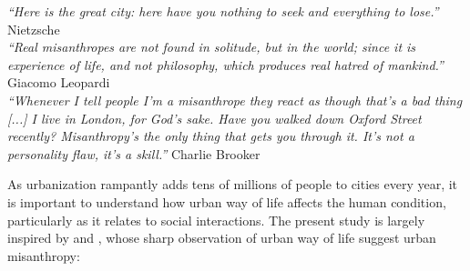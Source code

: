 \documentclass[11pt, letterpaper]{article}
\newcommand{\emd}[1]{\ExecuteMetaData[/tmp/tex]{#1}} %
\begin{document}

\begin{spacing}{1.4} %
\vspace{.25in}

{\small\it \noindent ``Here is the great city: here have you nothing to seek and
  everything to lose.''} Nietzsche\\

{\small\it \noindent ``Real misanthropes are not found in solitude, but in the world; since it is experience of life, and not philosophy, which produces real hatred of mankind.''} Giacomo Leopardi\\

{\small\it \noindent ``Whenever I tell people I'm a misanthrope they react as
  though that's a bad thing [...] I live in London, for God's sake. Have you
  walked down Oxford Street recently? Misanthropy's the only thing that gets you
  through it. It's not a personality flaw, it's a skill.''} Charlie Brooker\\


\newpage
 
\noindent As urbanization rampantly adds tens of millions of people to cities every year,
it is important to understand how urban way of life affects the human condition,
particularly as it relates to social interactions. The present study is largely 
inspired by \citet{amin06} and \citet{thrift05}, whose sharp observation of
urban way of life suggest urban misanthropy: 


\end{spacing}
\end{document}
